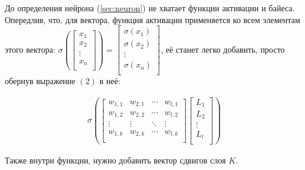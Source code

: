 \documentclass{article}
\begin{document}
    
        До определения нейрона (\ref{sec:neuron}) 
        не хватает функции активации и байеса.
        Опередлив, что, для вектора, функция активации применяется
        ко всем элементам этого вектора:
        $
            \sigma
            \left(
                \begin{bmatrix}
                    x_1     \\
                    x_2     \\
                    \vdots  \\
                    x_n     \\
                \end{bmatrix}
            \right) = 
            \begin{bmatrix}
                \sigma(x_1) \\
                \sigma(x_2) \\
                \vdots      \\
                \sigma(x_n) \\
            \end{bmatrix}
        $,
        её станет легко добавить, просто обернув выражение $(2)$ в неё:

        \begin{align}
            \sigma
            \left(
            \begin{bmatrix}
                w_{1,1} & w_{2,1} & \cdots  & w_{l,1} \\
                w_{1,2} & w_{2,2} & \cdots  & w_{l,2} \\
                \vdots  & \vdots  & \ddots  & \vdots  \\
                w_{1,k} & w_{2,k} & \cdots  & w_{l,k} \\
            \end{bmatrix}
            \begin{bmatrix}
                L_1    \\
                L_2    \\
                \vdots \\
                L_l    \\
            \end{bmatrix}
            \right)
        \end{align}

        Также внутри функции, нужно добавить вектор сдвигов слоя $K$.
\end{document}
